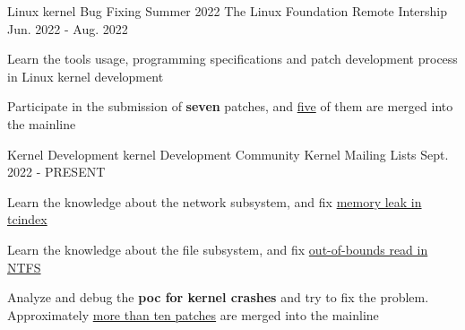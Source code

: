 

\begin{cventries}

  \cventry
    {Linux kernel Bug Fixing Summer 2022} %
    {The Linux Foundation} %
    {Remote Intership} %
    {Jun. 2022 - Aug. 2022} %
    {
      \begin{cvitems} %
        \item {Learn the tools usage, programming specifications and patch development process in Linux kernel development}
        \item {Participate in the submission of \textbf{seven} patches, and \href{https://git.kernel.org/pub/scm/linux/kernel/git/torvalds/linux.git/log/?qt=grep&q=hawkins+jiawei}{\textcolor{awesome-skyblue}{five}} of them are merged into the mainline}
      \end{cvitems}
    }

  \cventry
    {Kernel Development} %
    {kernel Development Community} %
    {Kernel Mailing Lists} %
    {Sept. 2022 - PRESENT} %
    {
      \begin{cvitems} %
        \item {Learn the knowledge about the network subsystem, and fix \href{https://git.kernel.org/pub/scm/linux/kernel/git/torvalds/linux.git/commit/?id=399ab7fe0fa0d846881685fd4e57e9a8ef7559f7}{\textcolor{awesome-skyblue}{memory leak in tcindex}}}
        \item {Learn the knowledge about the file subsystem, and fix \href{https://git.kernel.org/pub/scm/linux/kernel/git/torvalds/linux.git/commit/?id=d85a1bec8e8d552ab13163ca1874dcd82f3d1550}{\textcolor{awesome-skyblue}{out-of-bounds read in NTFS}}}
        \item {Analyze and debug the \textbf{poc for kernel crashes} and try to fix the problem. Approximately \href{https://git.kernel.org/pub/scm/linux/kernel/git/torvalds/linux.git/log/?qt=author&q=hawkins+jiawei}{\textcolor{awesome-skyblue}{more than ten patches}} are merged into the mainline}
      \end{cvitems}
    }


\end{cventries}
